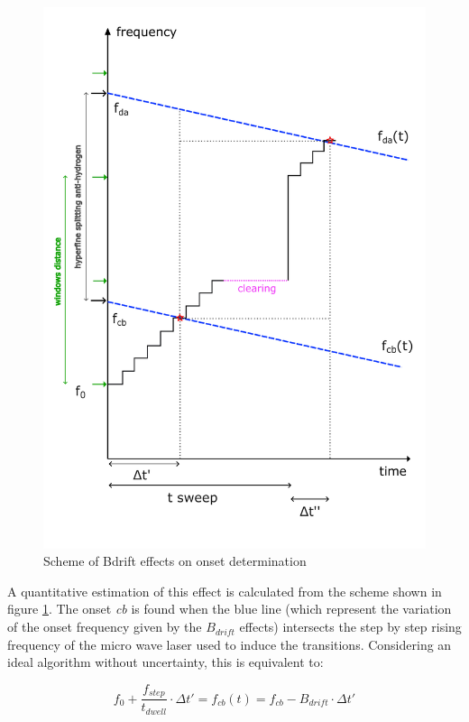 \documentclass[11pt,a4paper,oneside]{article}
\begin{document}
\begin{figure}[hbtp]
\centering
\includegraphics[scale= 0.60]{SchemeBdrift.pdf}
\caption{Scheme of Bdrift effects on onset determination}\label{fig:SchemeBdrift}
\end{figure}


A quantitative estimation of this effect is calculated from the scheme shown in figure \ref{fig:SchemeBdrift}. The onset \textit{cb} is found when the blue line (which represent the variation of the onset frequency given by the $B_{drift}$ effects) intersects the step by step rising frequency of the micro wave laser used to induce the transitions. Considering an ideal algorithm without uncertainty, this is equivalent to:

\begin{equation} \label{eq:cbOnset}
f_{0} + \dfrac{f_{step}}{t_{dwell}} \cdot \Delta t' = f_{cb}(t) = f_{cb} - B_{drift} \cdot \Delta t'
\end{equation}
\end{document}
